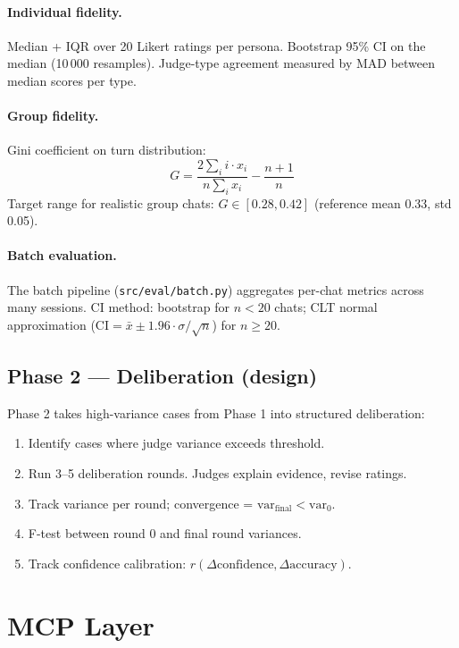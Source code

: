 \documentclass[12pt,a4paper]{article}
\begin{document}
\paragraph{Individual fidelity.}
Median + IQR over 20 Likert ratings per persona. Bootstrap 95\% CI on the median
(10\,000 resamples). Judge-type agreement measured by MAD between median scores per type.

\paragraph{Group fidelity.}
Gini coefficient on turn distribution:
\[
G = \frac{2 \sum_i i \cdot x_i}{n \sum_i x_i} - \frac{n+1}{n}
\]
Target range for realistic group chats: $G \in [0.28, 0.42]$ (reference mean 0.33, std 0.05).

\paragraph{Batch evaluation.}
The batch pipeline (\texttt{src/eval/batch.py}) aggregates per-chat metrics across many sessions.
CI method: bootstrap for $n < 20$ chats; CLT normal approximation
($\text{CI} = \bar{x} \pm 1.96 \cdot \sigma / \sqrt{n}$) for $n \geq 20$.

\subsection{Phase 2 --- Deliberation (design)}

Phase 2 takes high-variance cases from Phase 1 into structured deliberation:
\begin{enumerate}
  \item Identify cases where judge variance exceeds threshold.
  \item Run 3--5 deliberation rounds. Judges explain evidence, revise ratings.
  \item Track variance per round; convergence = $\text{var}_{\text{final}} < \text{var}_0$.
  \item F-test between round 0 and final round variances.
  \item Track confidence calibration: $r(\Delta\text{confidence}, \Delta\text{accuracy})$.
\end{enumerate}

\section{MCP Layer}
\end{document}
